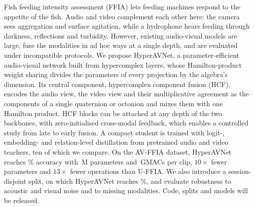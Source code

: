 Fish feeding intensity assessment (FFIA) lets feeding machines respond to the appetite of the fish.
Audio and video complement each other here: the camera sees aggregation and surface agitation, while a
hydrophone hears feeding through darkness, reflections and turbidity. However, existing audio-visual
models are large, fuse the modalities in ad hoc ways at a single depth, and are evaluated under
incompatible protocols. We propose HyperAVNet, a parameter-efficient audio-visual network built from
hypercomplex layers, whose Hamilton-product weight sharing divides the parameters of every projection
by the algebra's dimension. Its central component, hypercomplex component fusion (HCF), encodes the
audio view, the video view and their multiplicative agreement as the components of a single quaternion
or octonion and mixes them with one Hamilton product. HCF blocks can be attached at any depth of the
two backbones, with zero-initialised cross-modal feedback, which enables a controlled study from late
to early fusion. A compact student is trained with logit-, embedding- and relation-level distillation
from pretrained audio and video teachers, ten of which we compare. On the AV-FFIA dataset, HyperAVNet
reaches \resOurAcc\% accuracy with \resOurParams\,M parameters and \resOurGMACs\,GMACs per clip,
$10\times$ fewer parameters and $13\times$ fewer operations than U-FFIA.  We also introduce a session-disjoint split, on which
HyperAVNet reaches \resGroupedAcc\%, and evaluate robustness to acoustic and visual noise and to missing
modalities. Code, splits and models will be released.
